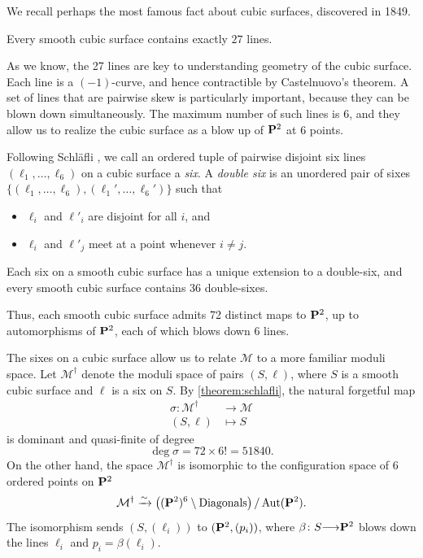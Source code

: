 \documentclass[reqno]{amsart}
\renewcommand{\to}{{\longrightarrow}}
\renewcommand {\P}{{\bf P}}
\providecommand{\Aut}{\operatorname{Aut}}
\numberwithin{equation}{section}
\begin{document}
We recall perhaps the most famous fact about cubic surfaces, discovered in 1849.
\begin{theorem}
  \label{theorem:cayleysalmon}
  Every smooth cubic surface contains exactly $27$ lines.
\end{theorem}
As we know, the 27 lines are key to understanding geometry of the
cubic surface.  Each line is a $(-1)$-curve, and hence contractible by
Castelnuovo's theorem.  A set of lines that are pairwise skew is
particularly important, because they can be blown down simultaneously.
The maximum number of such lines is 6, and they allow us to realize
the cubic surface as a blow up of $\P^2$ at 6 points.

Following Schl\"afli \cite{sch:58}, we call an ordered tuple of pairwise disjoint six lines $(\ell_1, \dots, \ell_6)$ on a cubic surface a \emph{six}.
A \emph{double six} is an unordered pair of sixes $\{(\ell_1, \dots, \ell_6), (\ell_1', \dots, \ell_6')\}$ such that
\begin{itemize}
\item $\ell_{i}$ and $\ell'_{i}$ are disjoint for all $i$, and
\item $\ell_{i}$ and $\ell'_{j}$ meet at a point whenever $i \neq j$.
\end{itemize}

\begin{theorem}
  \label{theorem:schlafli} Each six on a smooth cubic surface has a unique extension to a double-six, and every smooth cubic surface contains $36$ double-sixes.
\end{theorem}
Thus, each smooth cubic surface admits 72 distinct maps to
$\P^2$, up to automorphisms of $\P^2$, each of which
blows down 6 lines.

The sixes on a cubic surface allow us to relate $\mathcal{M}$ to a more
familiar moduli space.  Let $\mathcal{M}^{\dagger}$ denote the moduli
space of pairs $(S, \ell)$, where $S$ is a smooth cubic surface and
$\ell$ is a six on $S$.  By \autoref{theorem:schlafli}, the natural
forgetful map
\begin{align*}
  \sigma \colon \mathcal{M}^{\dagger} &\to \mathcal{M} \\
  (S, \ell) &\mapsto S
\end{align*}
is dominant and quasi-finite of degree
\[ \deg \sigma = 72 \times 6! = 51840.\] On the other hand, the space
$\mathcal{M}^{\dagger}$ is isomorphic to the configuration space of 6
ordered points on $\P^2$
\[ \mathcal{M}^{\dagger} \xrightarrow{\sim} \left( (\P^2)^6 \setminus
    \text{Diagonals} \right) / \Aut(\P^2).\] The isomorphism sends
$(S, (\ell_i))$ to $(\P^2, (p_i))$, where $\beta \colon S \to \P^2$
blows down the lines $\ell_i$ and $p_i = \beta(\ell_i)$.
\end{document}
